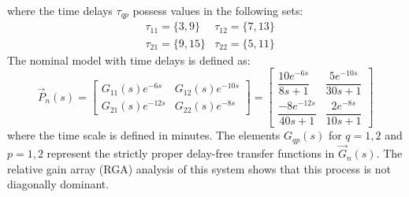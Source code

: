 \documentclass[default]{svmult}
\begin{document}
where the time delays $\tau_{qp}$ possess values in the following sets:
\begin{align}\label{eq:mimo_un}
&\tau_{11}=\{3,9\}  &\tau_{12}=\{7,13\} \nonumber\\
&\tau_{21}=\{9,15\} &\tau_{22}=\{5,11\}
\end{align}
The nominal model  with time delays is defined as:
\begin{equation}
\renewcommand{\arraystretch}{2.2}
\vec{P}_n(s)=
\begin{bmatrix}
         G_{11}(s)e^{-6s} & G_{12}(s)e^{-10s}\\
         G_{21}(s)e^{-12s} & G_{22}(s)e^{-8s}
\end{bmatrix}
=
\begin{bmatrix}
         \dfrac{10e^{-6s}}{8s+1} & \dfrac{5e^{-10s}}{30s+1}\\
         \dfrac{-8e^{-12s}}{40s+1} & \dfrac{2e^{-8s}}{10s+1}
\end{bmatrix}
\end{equation}
where the time scale is defined in minutes. The elements $G_{qp}(s)$ for $q=1,2$ and $p=1,2$ represent the strictly proper delay-free transfer functions in $\vec{G}_n(s)$. The relative gain array (RGA) analysis of this system shows that this process is not diagonally dominant.
\end{document}
